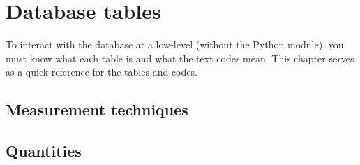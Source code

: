 %

\chapter{Database tables}

To interact with the database at a low-level (without the Python module), you
must know what each table is and what the text codes mean.  This chapter serves
as a quick reference for the tables and codes.


\section{Measurement techniques}




\section{Quantities}



